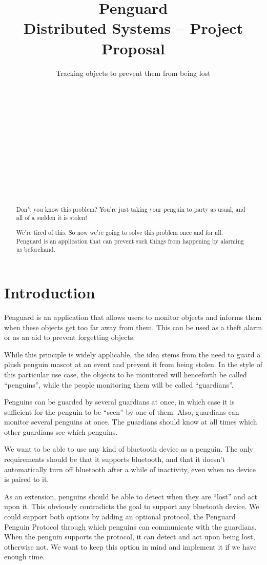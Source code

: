 \documentclass{report}
\title{Penguard\\
\normalsize{Distributed Systems -- Project Proposal}}
\subtitle{Tracking objects to prevent them from being lost}
\author{
\alignauthor {\normalsize Nils Leuzinger}\\
	\affaddr{{\normalsize 14-939-896}}\\
	\email{{\normalsize nilsl@student.ethz.ch}}
\alignauthor {\normalsize Nicole Thurnherr}\\
	\affaddr{{\normalsize 11-925-328}}\\
	\email{{\normalsize nicoleth@student.ethz.ch}}
\alignauthor {\normalsize Aline Abler}\\
	\affaddr{{\normalsize 14-920-979}}\\
	\email{{\normalsize ablera@student.ethz.ch}}
\and
\alignauthor {\normalsize Sascha Tribelhorn}\\
	\affaddr{{\normalsize 13-914-692}}\\
	\email{{\normalsize tsascha@student.ethz.ch}}
\alignauthor {\normalsize Luca Wolf}\\
	\affaddr{{\normalsize 12-913-539}}\\
	\email{{\normalsize lwolf@student.ethz.ch}}
}
\begin{document}
\maketitle

\begin{abstract}
Don't you know this problem? You're just taking your penguin to party as usual, and all of a sudden it is stolen! 

We're tired of this. So now we're going to solve this problem once and for all. Penguard is an application that can prevent such things from happening by alarming us beforehand.
\end{abstract}

\section{Introduction}

Penguard is an application that allows users to monitor objects and informs them when these objects get too far away from them. This can be used as a theft alarm or as an aid to prevent forgetting objects.

While this principle is widely applicable, the idea stems from the need to guard a plush penguin mascot at an event and prevent it from being stolen. In the style of this particular use case, the objects to be monitored will henceforth be called ``penguins'', while the people monitoring them will be called ``guardians''.

Penguins can be guarded by several guardians at once, in which case it is sufficient for the penguin to be ``seen'' by one of them. Also, guardians can monitor several penguins at once. The guardians should know at all times which other guardians see which penguins.

We want to be able to use any kind of bluetooth device as a penguin. The only requirements should be that it supports bluetooth, and that it doesn't automatically turn off bluetooth after a while of inactivity, even when no device is paired to it.

As an extension, penguins should be able to detect when they are ``lost'' and act upon it. This obviously contradicts the goal to support any bluetooth device. We could support both options by adding an optional protocol, the Penguard Penguin Protocol through which penguins can communicate with the guardians. When the penguin supports the protocol, it can detect and act upon being lost, otherwise not. We want to keep this option in mind and implement it if we have enough time.
\end{document}

